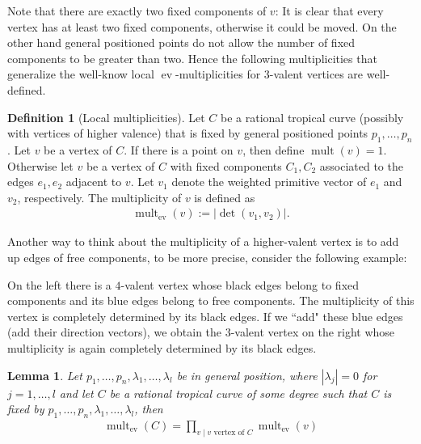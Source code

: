 \documentclass[11pt,reqno,a4]{amsart}
\theoremstyle{dotless}
\newtheorem{lemma}[corollary]{Lemma}
\theoremstyle{definition}
\newtheorem{definition}[corollary]{Definition}
\newcommand{\mult}{\operatorname{mult}}
\newcommand{\ev}{\operatorname{ev}}
\begin{document}
Note that there are exactly two fixed components of $v$: It is clear that every vertex has at least two fixed components, otherwise it could be moved. On the other hand general positioned points do not allow the number of fixed components to be greater than two. Hence the following multiplicities that generalize the well-know local $\ev$-multiplicities for $3$-valent vertices are well-defined.


\begin{definition}[Local multiplicities]\label{definition:local_multiplicities}
Let $C$ be a rational tropical curve (possibly with vertices of higher valence) that is fixed by general positioned points $p_1,\dots,p_n$. Let $v$ be a vertex of $C$. If there is a point on $v$, then define $\mult(v)=1$. Otherwise let $v$ be a vertex of $C$ with fixed components $C_1,C_2$ associated to the edges $e_1,e_2$ adjacent to $v$. Let $v_1$ denote the weighted primitive vector of $e_1$ and $v_2$, respectively. The multiplicity of $v$ is defined as
\begin{align*}
\mult_{\ev}(v):=|\det\left( v_1,v_2 \right)|.
\end{align*}
\end{definition}

Another way to think about the multiplicity of a higher-valent vertex is to add up edges of free components, to be more precise, consider the following example: 
\begin{figure}[H]
\centering
\def\svgwidth{250pt}

\end{figure}
\noindent On the left there is a $4$-valent vertex whose black edges belong to fixed components and its blue edges belong to free components. The multiplicity of this vertex is completely determined by its black edges. If we ``add" these blue edges (add their direction vectors), we obtain the $3$-valent vertex on the right whose multiplicity is again completely determined by its black edges.



\begin{lemma}\label{lemma:local_multiplicities}
Let $p_1,\dots,p_n,\lambda_1,\dots,\lambda_l$ be in general position, where $|\lambda_j|=0$ for $j=1,\dots,l$ and let $C$ be a rational tropical curve of some degree such that $C$ is fixed by $p_1,\dots,p_n,\lambda_1,\dots,\lambda_l$, then
\begin{align*}
\mult_{\ev}(C)=\prod_{v\mid v \textrm{ vertex of }C}\mult_{\ev}(v)
\end{align*}
\end{lemma}
\end{document}
